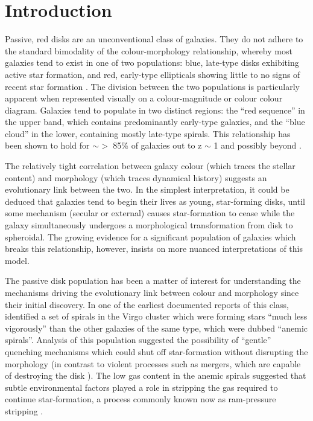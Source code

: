 \documentclass[useAMS,usenatbib]{mn2e}
\begin{document}
\section{Introduction}
\label{sec:Intro}

Passive, red disks are an unconventional class of galaxies. They do not adhere to the standard bimodality of the colour-morphology relationship, whereby most galaxies tend to exist in one of two populations: blue, late-type disks exhibiting active star formation, and red, early-type ellipticals showing little to no signs of recent star formation \citep{Strateva2001, Baldry2004, Correa2017}. The division between the two populations is particularly apparent when represented visually on a colour-magnitude or colour colour diagram. Galaxies tend to populate in two distinct regions: the ``red sequence'' in the upper band, which contains predominantly early-type galaxies, and the ``blue cloud'' in the lower, containing mostly late-type spirals. This relationship has been shown to hold for $\sim >$ 85\% of galaxies out to z $\sim$ 1 \citep{Bell2004,Cirasuolo2007,Mignoli2009} and possibly beyond \citep{Giallongo2005, vanDokkum2006, Franzetti2007, Cassata2008}. 

The relatively tight correlation between galaxy colour (which traces the stellar content) and morphology (which traces dynamical history) suggests an evolutionary link between the two. In the simplest interpretation, it could be deduced that galaxies tend to begin their lives as young, star-forming disks, until some mechanism (secular or external) causes star-formation to cease while the galaxy simultaneously undergoes a morphological transformation from disk to spheroidal. The growing evidence for a significant population of galaxies which breaks this relationship, however, insists on more nuanced interpretations of this model. 

The passive disk population has been a matter of interest for understanding the mechanisms driving the evolutionary link between colour and morphology since their initial discovery.  In one of the earliest documented reports of this class, \citet{VandenBergh1976} identified a set of spirals in the Virgo cluster which were forming stars ``much less vigorously'' than the other galaxies of the same type, which were dubbed ``anemic spirals''. Analysis of this population suggested the possibility of ``gentle'' quenching mechanisms which could shut off star-formation without disrupting the morphology (in contrast to violent processes such as mergers, which are capable of destroying the disk \citep{Bell2004,Negroponte1983,DeLucia2006,Springel2005}). The low gas content in the anemic spirals suggested that subtle environmental factors played a role in stripping the gas required to continue star-formation, a process commonly known now as ram-pressure stripping \citep{Gunn1972,Steinhauser2016}. 
\end{document}
